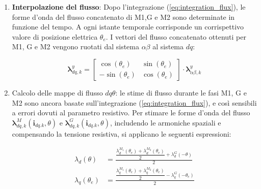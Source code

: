 \begin{enumerate}
Tale espressione si può ricavare applicando la media integrale ad entrambi i membri dell'equazioni:
\begin{equation}
mean(\boldsymbol{\lambda}_{\alpha\beta}^{y}(t)) = mean(\boldsymbol{\lambda}_{\alpha\beta}^{y}(t=0) + \int_{t_{0}}^{t_{0}+T} (\boldsymbol{v}_{\alpha\beta}^{y} - R_{s} \cdot \boldsymbol{i}_{\alpha\beta}^{y}) dt )
\end{equation}

Dato che la media del flusso $\lambda_{\alpha\beta}$ su un periodo meccanico deve essere nulla e alla proprietà di linearità:
\begin{equation}
0 = mean(\boldsymbol{\lambda}_{\alpha\beta}^{y}(t=0)) + mean(\int_{t_{0}}^{t_{0}+T} (\boldsymbol{v}_{\alpha\beta}^{y} - R_{s} \cdot \boldsymbol{i}_{\alpha\beta}^{y}) dt)
\end{equation}

Tenenendo conto che la media integrale di un valore costante  equivale proprio a tale valore, si ottiene infine l'equazione \ref{eq:eq1}

\item \textbf{Interpolazione del flusso}: Dopo l'integrazione (\ref{eq:integration_flux}), le forme d'onda del flusso concatenato di M1,G e M2 sono determinate in funzione del tempo. A ogni istante temporale corrisponde un corrispettivo valore di posizione elettrica $\theta_e$. I vettori del flusso concatenato ottenuti per M1, G e M2 vengono ruotati dal sistema $\alpha\beta$ al sistema $dq$:

\begin{equation}
\boldsymbol{\lambda}_{dq,k}^y = 
\begin{bmatrix} 
\cos(\theta_e) & \sin(\theta_e) \\ 
-\sin(\theta_e) & \cos(\theta_e) 
\end{bmatrix} \cdot 
\boldsymbol{\lambda}_{\alpha\beta,k}^y \label{eq:matx_tr_dq}
\end{equation}

\item Calcolo delle mappe di flusso $dq\theta$: le stime di flusso durante le fasi M1, G e M2 sono ancora basate sull'integrazione (\ref{eq:integration_flux}), e così sensibili a errori dovuti al parametro resistivo. Per stimare le forme d'onda del flusso $\bm{\lambda}_{dq,k}^M(\bm{i}_{dq.k},\theta)$ e $\bm{\lambda}_{dq,k}^G(\bm{i}_{dq.k},\theta)$, includendo le armoniche spaziali e compensando la tensione resistiva, si applicano le seguenti espressioni:

\begin{subequations}
\label{eq:flussi_dq}
\begin{align}
    \lambda_d(\theta) &= \frac{\dfrac{\lambda_d^{M_1}(\theta_e) + \lambda_d^{M_2}(\theta_e)}{2} + \lambda_d^G(-\theta)}{2}  \\
    \lambda_q(\theta_e) &= \frac{\dfrac{\lambda_q^{M_1}(\theta_e) + \lambda_q^{M_2}(\theta_e)}{2} - \lambda_q^G(-\theta_e)}{2} \label{eq:estem_dq_l}
\end{align}
\end{subequations}

\end{enumerate}



